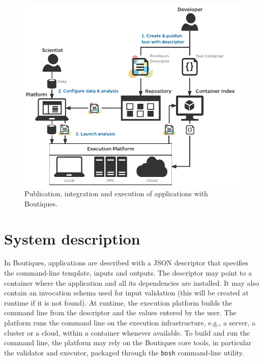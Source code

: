 \documentclass[a4paper,num-refs]{oup-contemporary}
\newcommand{\boutiques}{Boutiques\xspace}
\begin{document}
\begin{figure}
  \includegraphics[width=\columnwidth]{boutiquesfig1.pdf}
  \caption{Publication, integration and execution of applications with \boutiques.}
  \label{fig:diagram}
\end{figure}


\section{System description}

In \boutiques, applications are described with a JSON descriptor that
specifies the command-line template, inputs and outputs. The
descriptor may point to a container where the application and all its
dependencies are installed. It may also contain an invocation schema
used for input validation (this will be created at runtime if it is
not found). At runtime, the execution platform builds the command line
from the descriptor and the values entered by the user. The platform runs
the command line on the execution infrastructure, e.g., a server, a
cluster or a cloud, within a container whenever available. To build
and run the command line, the platform may rely on the \boutiques core
tools, in particular the validator and executor, packaged through the
\texttt{bosh} command-line utility.
\end{document}
